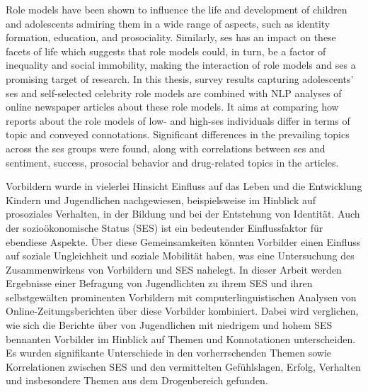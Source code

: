 Role models have been shown to influence the life and development of children and adolescents admiring them in a wide range of aspects, such as identity formation, education, and prosociality. Similarly, \gls{ses} has an impact on these facets of life which suggests that role models could, in turn, be a factor of inequality and social immobility, making the interaction of role models and \gls{ses} a promising target of research. In this thesis, survey results capturing adolescents' \gls{ses} and self-selected celebrity role models are combined with NLP analyses of online newspaper articles about these role models. It aims at comparing how reports about the role models of low- and high-\gls{ses} individuals differ in terms of topic and conveyed connotations. Significant differences in the prevailing topics across the \gls{ses} groups were found, along with correlations between \gls{ses} and sentiment, success, prosocial behavior and drug-related topics in the articles.

\vspace{2cm}
Vorbildern wurde in vielerlei Hinsicht Einfluss auf das Leben und die Entwicklung Kindern und Jugendlichen nachgewiesen, beispielsweise im Hinblick auf prosoziales Verhalten, in der Bildung und bei der Entstehung von Identität. Auch der sozioökonomische Status (SES) ist ein bedeutender Einflussfaktor für ebendiese Aspekte. Über diese Gemeinsamkeiten könnten Vorbilder einen Einfluss auf soziale Ungleichheit und soziale Mobilität haben, was eine Untersuchung des Zusammenwirkens von Vorbildern und SES nahelegt. In dieser Arbeit werden Ergebnisse einer Befragung von Jugendlichten zu ihrem SES und ihren selbstgewälten prominenten Vorbildern mit computerlinguistischen Analysen von Online-Zeitungsberichten über diese Vorbilder kombiniert. Dabei wird verglichen, wie sich die Berichte über von Jugendlichen mit niedrigem und hohem SES bennanten Vorbilder im Hinblick auf Themen und Konnotationen unterscheiden. Es wurden signifikante Unterschiede in den vorherrschenden Themen sowie Korrelationen zwischen SES und den vermittelten Gefühlslagen, Erfolg, Verhalten und insbesondere Themen aus dem Drogenbereich gefunden.

\glsresetall